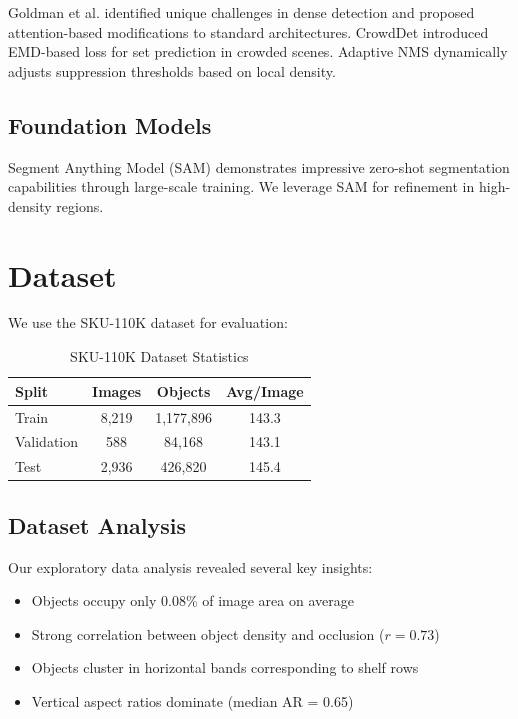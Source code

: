 \documentclass[conference]{IEEEtran}
\begin{document}
Goldman et al. \cite{goldman2019precise} identified unique challenges in dense detection and proposed attention-based modifications to standard architectures. CrowdDet \cite{chu2020detection} introduced EMD-based loss for set prediction in crowded scenes. Adaptive NMS \cite{liu2019adaptive} dynamically adjusts suppression thresholds based on local density.

\subsection{Foundation Models}

Segment Anything Model (SAM) \cite{kirillov2023segment} demonstrates impressive zero-shot segmentation capabilities through large-scale training. We leverage SAM for refinement in high-density regions.

\section{Dataset}

We use the SKU-110K dataset for evaluation:

\begin{table}[H]
\centering
\caption{SKU-110K Dataset Statistics}
\begin{tabular}{lccc}
\toprule
\textbf{Split} & \textbf{Images} & \textbf{Objects} & \textbf{Avg/Image} \\
\midrule
Train & 8,219 & 1,177,896 & 143.3 \\
Validation & 588 & 84,168 & 143.1 \\
Test & 2,936 & 426,820 & 145.4 \\
\bottomrule
\end{tabular}
\end{table}

\subsection{Dataset Analysis}

Our exploratory data analysis revealed several key insights:

\begin{itemize}
    \item Objects occupy only 0.08\% of image area on average
    \item Strong correlation between object density and occlusion ($r = 0.73$)
    \item Objects cluster in horizontal bands corresponding to shelf rows
    \item Vertical aspect ratios dominate (median AR = 0.65)
\end{itemize}
\end{document}
